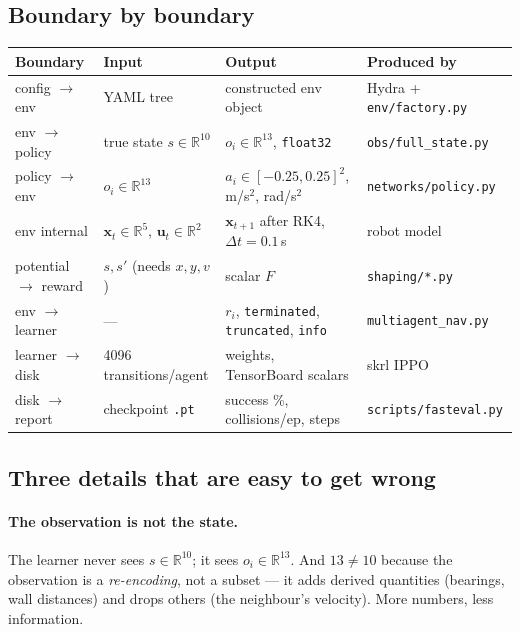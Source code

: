 \documentclass[11pt,a4paper]{article}
\newcommand{\code}[1]{\texttt{\small #1}}
\newcommand{\R}{\mathbb{R}}
\newcommand{\bx}{\mathbf{x}}
\newcommand{\bu}{\mathbf{u}}
\begin{document}
\subsection{Boundary by boundary}

\begin{center}
\footnotesize
\begin{tabular}{p{2.5cm}p{3.5cm}p{3.4cm}p{4.0cm}}
\toprule
\textbf{Boundary} & \textbf{Input} & \textbf{Output} & \textbf{Produced by} \\
\midrule
config $\to$ env & YAML tree & constructed env object & Hydra + \code{env/factory.py} \\
\addlinespace
env $\to$ policy & true state $s\in\R^{10}$ & $o_i \in \R^{13}$, \code{float32} & \code{obs/full\_state.py} \\
\addlinespace
policy $\to$ env & $o_i \in \R^{13}$ & $a_i \in [-0.25,0.25]^2$, m/s$^2$, rad/s$^2$ & \code{networks/policy.py} \\
\addlinespace
env internal & $\bx_t\in\R^5$, $\bu_t\in\R^2$ & $\bx_{t+1}$ after RK4, $\Delta t=0.1$\,s & robot model \\
\addlinespace
potential $\to$ reward & $s,s'$ (needs $x,y,v$) & scalar $F$ & \code{shaping/*.py} \\
\addlinespace
env $\to$ learner & --- & $r_i$, \code{terminated}, \code{truncated}, \code{info} & \code{multiagent\_nav.py} \\
\addlinespace
learner $\to$ disk & 4096 transitions/agent & weights, TensorBoard scalars & skrl IPPO \\
\addlinespace
disk $\to$ report & checkpoint \code{.pt} & success \%, collisions/ep, steps & \code{scripts/fasteval.py} \\
\bottomrule
\end{tabular}
\end{center}

\subsection{Three details that are easy to get wrong}

\paragraph{The observation is not the state.} The learner never sees $s\in\R^{10}$; it sees
$o_i\in\R^{13}$. And $13 \ne 10$ because the observation is a \emph{re-encoding}, not a
subset --- it adds derived quantities (bearings, wall distances) and drops others (the
neighbour's velocity). More numbers, less information.
\end{document}
